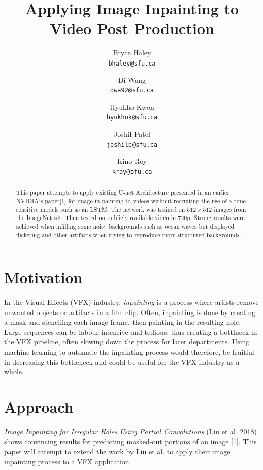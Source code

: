 \documentclass{article}
\title{Applying Image Inpainting to Video Post Production}
\author{%
  Bryce Haley \\
  \texttt{bhaley@sfu.ca} \\
  \and
  Di Wang \\
  \texttt{dwa92@sfu.ca} \\
  \and
  Hyukho Kwon \\
  \texttt{hyukhok@sfu.ca} \\
  \and
  Joshil Patel \\
  \texttt{joshilp@sfu.ca} \\
  \and
  Kino Roy \\
  \texttt{kroy@sfu.ca} \\
}
\begin{document}

\maketitle

\begin{abstract}
  
  This paper attempts to apply existing U-net Architecture presented in an earlier NVIDIA's paper[1] for image in-painting to videos without recruiting the use of a time sensitive models such as an LSTM. The network was trained on  $512\times512$ images from the ImageNet set. Then tested on publicly available video in 720p. Strong results were achieved when infilling some noisy backgrounds such as ocean waves but displayed flickering and other artifacts when trying to reproduce more structured backgrounds. 
\end{abstract}

\section{Motivation}

\paragraph{}
In the Visual Effects (VFX) industry, \textit{inpainting} is a process where artists remove unwanted objects or artifacts in a film clip. Often, inpainting is done by creating a mask and stenciling each image frame, then painting in the resulting hole. Large sequences can be labour intensive and tedious, thus creating a bottlneck in the VFX pipeline, often slowing down the process for later departments. Using machine learning to automate the inpainting process would therefore, be fruitful in decreasing this bottleneck and could be useful for the VFX industry as a whole.

\section{Approach}
\paragraph{}
\textit{Image Inpainting for Irregular Holes Using Partial Convolutions} (Liu et al. 2018) shows convincing results for predicting masked-out portions of an image [1]. This paper will attempt to extend the work by Liu et al. to apply their image inpainting process to a VFX application.
\end{document}
